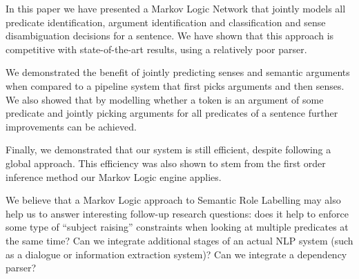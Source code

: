In this paper we have presented a Markov Logic Network that jointly
models all predicate identification, argument identification and
classification and sense disambiguation decisions for a sentence. We
have shown that this approach is competitive with state-of-the-art
results, using a relatively poor parser. 

We demonstrated the
benefit of jointly predicting senses and semantic arguments when
compared to a pipeline system that first picks arguments and then
senses. We also showed that by modelling whether a token is an
argument of some predicate and jointly picking arguments for all
predicates of a sentence further improvements can be achieved.  

Finally, we demonstrated that our system is still efficient, despite
following a global approach. This efficiency was also shown to stem
from the first order inference method our Markov Logic engine
applies. 

We believe that a Markov Logic approach to Semantic Role Labelling may
also help us to answer interesting follow-up research questions: does it help to
enforce some type of ``subject raising'' constraints when looking at
multiple predicates at the same time? Can we integrate additional
stages of an actual NLP system (such as a dialogue or information
extraction system)? Can we integrate a dependency parser?     
